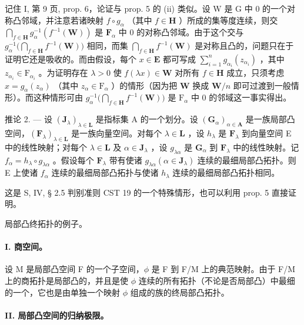 记住 I, 第 9 页, prop. 6，论证与 prop. 5 的 (ii) 类似。设 W 是 G 中 0 的一个对称凸邻域，并注意若诸映射 \(f \circ g_{\alpha}\) （其中 \(f \in \mathbf{H}\) ）所成的集等度连续，则交 \(\bigcap_{f \in \mathbf{H}} g_{\alpha}^{-1}(f^{-1}(\mathbf{W}))\) 是 \(\mathbf{F}_{\alpha}\) 中 0 的对称凸邻域。由于这个交与 \(g_{\alpha}^{-1}\big(\bigcap_{f \in \mathbf{H}} f^{-1}(\mathbf{W})\big)\) 相同，而集 \(\bigcap_{f \in \mathbf{H}} f^{-1}(\mathbf{W})\) 是对称且凸的，问题只在于证明它还是吸收的。而由假设，每个 \(x \in \mathbf{E}\) 都可写成 \(\sum_{i=1}^{n} g_{\alpha_i}(z_{\alpha_i})\) ，其中 \(z_{\alpha_i} \in \mathrm{F}_{\alpha_i}\) 。为证明存在 \(\lambda > 0\) 使 \(f(\lambda x) \in \mathbf{W}\) 对所有 \(f \in \mathbf{H}\) 成立，只须考虑 \(x = g_{\alpha}(z_{\alpha})\) （其中 \(z_{\alpha} \in \mathrm{F}_{\alpha}\) ）的情形（因为把 \(\mathbf{W}\) 换成 \(\mathbf{W}/n\) 即可过渡到一般情形）。而这种情形可由 \(g_{\alpha}^{-1}\big(\bigcap_{f \in \mathbf{H}} f^{-1}(\mathbf{W})\big)\) 是 \(\mathrm{F}_{\alpha}\) 中 0 的邻域这一事实得出。

推论 2. --- 设 \((\mathbf{J}_{\lambda})_{\lambda \in \mathbf{L}}\) 是指标集 A 的一个划分。设 \((\mathbf{G}_{\alpha})_{\alpha \in \mathbf{A}}\) 是一族局部凸空间，\((\mathbf{F}_{\lambda})_{\lambda \in \mathbf{L}}\) 是一族向量空间。对每个 \(\lambda \in \mathbf{L}\) ，设 \(h_{\lambda}\) 是 \(\mathbf{F}_{\lambda}\) 到向量空间 E 中的线性映射；对每个 \(\lambda \in \mathbf{L}\) 及 \(\alpha \in \mathbf{J}_{\lambda}\) ，设 \(g_{\lambda \alpha}\) 是 \(\mathbf{G}_{\alpha}\) 到 \(\mathbf{F}_{\lambda}\) 中的线性映射。记 \(f_{\alpha} = h_{\lambda} \circ g_{\lambda \alpha}\) 。假设每个 \(\mathbf{F}_{\lambda}\) 带有使诸 \(g_{\lambda \alpha} (\alpha \in \mathbf{J}_{\lambda})\) 连续的最细局部凸拓扑。则 E 上使诸 \(f_{\alpha}\) 连续的最细局部凸拓扑与使诸 \(h_{\lambda}\) 连续的最细局部凸拓扑相同。

这是 S, IV, § 2.5 判别准则 CST 19 的一个特殊情形，也可以利用 prop. 5 直接证明。

局部凸终拓扑的例子。

\paragraph{I. 商空间。}

设 M 是局部凸空间 F 的一个子空间，\(\phi\) 是 F 到 F/M 上的典范映射。由于 F/M 上的商拓扑是局部凸的，并且是使 \(\phi\) 连续的所有拓扑（不论是否局部凸）中最细的一个，它也是由单独一个映射 \(\phi\) 组成的族的终局部凸拓扑。

\paragraph{II. 局部凸空间的归纳极限。}

